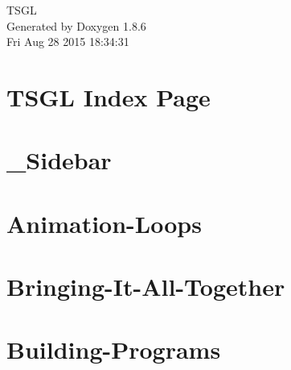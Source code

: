 \documentclass[twoside]{book}
\newcommand{\clearemptydoublepage}{%
  \newpage{\pagestyle{empty}\cleardoublepage}%
}
\begin{document}
\hypersetup{pageanchor=false}
\begin{titlepage}
\vspace*{7cm}
\begin{center}%
{\Large T\-S\-G\-L }\\
\vspace*{1cm}
{\large Generated by Doxygen 1.8.6}\\
\vspace*{0.5cm}
{\small Fri Aug 28 2015 18:34:31}\\
\end{center}
\end{titlepage}
\clearemptydoublepage
\tableofcontents
\clearemptydoublepage
{}
\hypersetup{pageanchor=true}

\chapter{T\-S\-G\-L Index Page}
\label{index}\hypertarget{index}{}
\chapter{\-\_\-\-Sidebar}
\label{md__home_kodemonkey__desktop__t_s_g_l_docs-wiki___sidebar}
\hypertarget{md__home_kodemonkey__desktop__t_s_g_l_docs-wiki___sidebar}{}

\chapter{Animation-\/\-Loops}
\label{md__home_kodemonkey__desktop__t_s_g_l_docs-wiki__animation-_loops}
\hypertarget{md__home_kodemonkey__desktop__t_s_g_l_docs-wiki__animation-_loops}{}

\chapter{Bringing-\/\-It-\/\-All-\/\-Together}
\label{md__home_kodemonkey__desktop__t_s_g_l_docs-wiki__bringing-_it-_all-_together}
\hypertarget{md__home_kodemonkey__desktop__t_s_g_l_docs-wiki__bringing-_it-_all-_together}{}

\chapter{Building-\/\-Programs}
\label{md__home_kodemonkey__desktop__t_s_g_l_docs-wiki__building-_programs}
\hypertarget{md__home_kodemonkey__desktop__t_s_g_l_docs-wiki__building-_programs}{}

\end{document}
